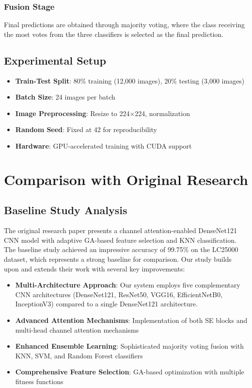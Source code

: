 \documentclass[journal]{IEEEtran}
\begin{document}
\subsubsection{Fusion Stage}

Final predictions are obtained through majority voting, where the class receiving the most votes from the three classifiers is selected as the final prediction.

\subsection{Experimental Setup}

\begin{itemize}
    \item \textbf{Train-Test Split}: 80\% training (12,000 images), 20\% testing (3,000 images)
    \item \textbf{Batch Size}: 24 images per batch
    \item \textbf{Image Preprocessing}: Resize to 224×224, normalization
    \item \textbf{Random Seed}: Fixed at 42 for reproducibility
    \item \textbf{Hardware}: GPU-accelerated training with CUDA support
\end{itemize}

\section{Comparison with Original Research}

\subsection{Baseline Study Analysis}

The original research paper \cite{baseline2025} presents a channel attention-enabled DenseNet121 CNN model with adaptive GA-based feature selection and KNN classification. The baseline study achieved an impressive accuracy of 99.75\% on the LC25000 dataset, which represents a strong baseline for comparison. Our study builds upon and extends their work with several key improvements:

\begin{itemize}
    \item \textbf{Multi-Architecture Approach}: Our system employs five complementary CNN architectures (DenseNet121, ResNet50, VGG16, EfficientNetB0, InceptionV3) compared to a single DenseNet121 architecture.
    \item \textbf{Advanced Attention Mechanisms}: Implementation of both SE blocks and multi-head channel attention mechanisms
    \item \textbf{Enhanced Ensemble Learning}: Sophisticated majority voting fusion with KNN, SVM, and Random Forest classifiers
    \item \textbf{Comprehensive Feature Selection}: GA-based optimization with multiple fitness functions
\end{itemize}
\end{document}
